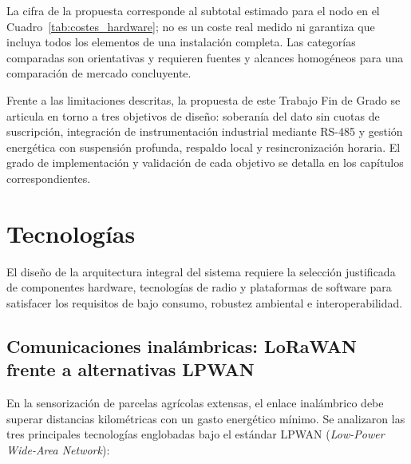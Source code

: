 La cifra de la propuesta corresponde al subtotal estimado para el nodo en el Cuadro~\ref{tab:costes_hardware}; no es un coste real medido ni garantiza que incluya todos los elementos de una instalación completa. Las categorías comparadas son orientativas y requieren fuentes y alcances homogéneos para una comparación de mercado concluyente.

Frente a las limitaciones descritas, la propuesta de este Trabajo Fin de Grado se articula en torno a tres objetivos de diseño: soberanía del dato sin cuotas de suscripción, integración de instrumentación industrial mediante RS-485 y gestión energética con suspensión profunda, respaldo local y resincronización horaria. El grado de implementación y validación de cada objetivo se detalla en los capítulos correspondientes.


\section{Tecnologías}

El diseño de la arquitectura integral del sistema requiere la selección justificada de componentes hardware, tecnologías de radio y plataformas de software para satisfacer los requisitos de bajo consumo, robustez ambiental e interoperabilidad.

\subsection{Comunicaciones inalámbricas: LoRaWAN frente a alternativas LPWAN}

En la sensorización de parcelas agrícolas extensas, el enlace inalámbrico debe superar distancias kilométricas con un gasto energético mínimo. Se analizaron las tres principales tecnologías englobadas bajo el estándar LPWAN (\textit{Low-Power Wide-Area Network}):

